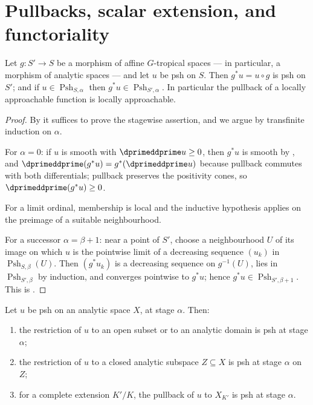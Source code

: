 \section{Pullbacks, scalar extension, and functoriality}
\label{sec:ch15-pullback}

\begin{proposition}
\label{prop:ch15-pullback-stagewise}
Let $g:S'\to S$ be a morphism of affine $G$-tropical spaces --- in
particular, a morphism of analytic spaces --- and let $u$ be psh on $S$.
Then $g^*u=u\circ g$ is psh on $S'$; and if
$u\in\operatorname{Psh}_{S,\alpha}$ then
$g^*u\in\operatorname{Psh}_{S',\alpha}$.  In particular the pullback of a
locally approachable function is locally approachable.
\end{proposition}

\begin{proof}
By  it suffices to prove the stagewise
assertion, and we argue by transfinite induction on $\alpha$.

For $\alpha=0$: if $u$ is smooth with $\dprimeddprime u\ge0$, then $g^*u$ is
smooth by , and
$\dprimeddprime(g^*u)=g^*(\dprimeddprime u)$ because pullback commutes with
both differentials; pullback preserves the positivity cones, so
$\dprimeddprime(g^*u)\ge0$.

For a limit ordinal, membership is local and the inductive hypothesis applies
on the preimage of a suitable neighbourhood.

For a successor $\alpha=\beta+1$: near a point of $S'$, choose a
neighbourhood $U$ of its image on which $u$ is the pointwise limit of a
decreasing sequence $(u_k)$ in $\operatorname{Psh}_{S,\beta}(U)$.  Then
$(g^*u_k)$ is a decreasing sequence on $g^{-1}(U)$, lies in
$\operatorname{Psh}_{S',\beta}$ by induction, and converges pointwise to
$g^*u$; hence $g^*u\in\operatorname{Psh}_{S',\beta+1}$.  This is
\cite[Proposition~8.1.5]{CLD25}.
\end{proof}

\begin{corollary}
\label{cor:ch15-pullback-cases}
Let $u$ be psh on an analytic space $X$, at stage $\alpha$.  Then:
\begin{enumerate}
\item\label{itm:ch15-pb-open} the restriction of $u$ to an open subset or to
  an analytic domain is psh at stage $\alpha$;
\item\label{itm:ch15-pb-closed} the restriction of $u$ to a closed analytic
  subspace $Z\subseteq X$ is psh at stage $\alpha$ on $Z$;
\item\label{itm:ch15-pb-ext} for a complete extension $K'/K$, the pullback of
  $u$ to $X_{K'}$ is psh at stage $\alpha$.
\end{enumerate}
\end{corollary}


